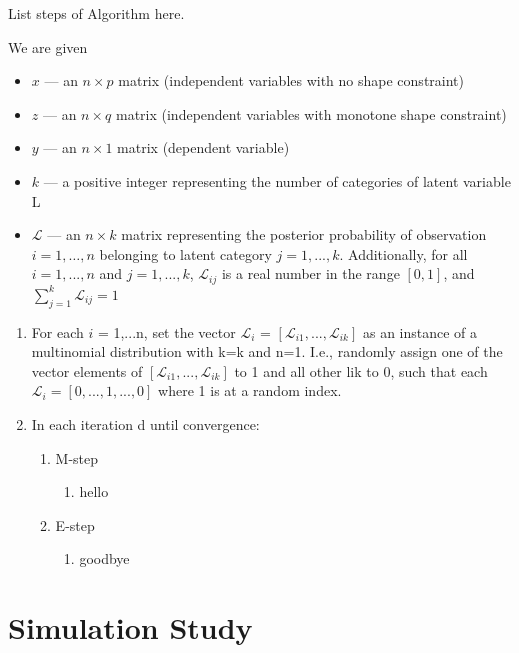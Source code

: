 \documentclass[fleqn,10pt]{olplainarticle}\usepackage[]{graphicx}\usepackage[]{color}
\begin{document}
List steps of Algorithm here.

We are given
\begin{itemize}
  \item[]	$x$ — an \(n \times p\) matrix (independent variables with no shape constraint)
  \item[]	$z$ — an \(n \times q\) matrix (independent variables with monotone shape constraint)
  \item[]	$y$ — an \(n \times 1\) matrix (dependent variable)
  \item[]	$k$ — a positive integer representing the number of categories of latent variable L
  \item[] \( \mathcal{L} \) — an \(n \times k\) matrix representing the posterior probability of observation \(i = 1,…,n\) belonging to latent category \(j = 1,...,k\). Additionally, for all \(i = 1,...,n\) and \(j = 1,...,k\), \( \mathcal{L}_{ij} \) is a real number in the range \([0,1]\), and \( \sum_{j=1}^{k} \mathcal{L}_{ij} = 1 \)
\end{itemize}

\begin{enumerate}
  \item For each \( i \) = 1,...n, set the vector \( \mathcal{L}_{i} \) = \( [\mathcal{L}_{i1},...,\mathcal{L}_{ik}] \) as an instance of a multinomial distribution with k=k and n=1. I.e., randomly assign one of the vector elements of \( [\mathcal{L}_{i1}, ..., \mathcal{L}_{ik}] \) to 1 and all other lik to 0, such that each \( \mathcal{L}_{i} = [0,..., 1, ...,0] \) where 1 is at a random index.
  \item In each iteration d until convergence:
    \begin{enumerate}
      \item M-step
        \begin{enumerate}
          \item hello
        \end{enumerate}
      \item E-step
        \begin{enumerate}
          \item goodbye
        \end{enumerate}
    \end{enumerate}
\end{enumerate}

\section{Simulation Study}
\end{document}
